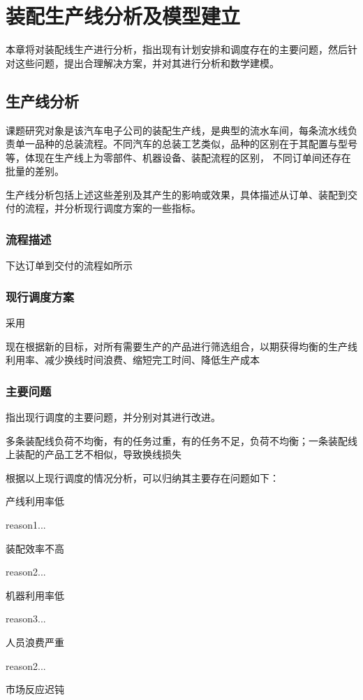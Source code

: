 \chapter{装配生产线分析及模型建立}
本章将对装配线生产进行分析，指出现有计划安排和调度存在的主要问题，然后针对这些问题，提出合理解决方案，并对其进行分析和数学建模。
\section{生产线分析}
课题研究对象是该汽车电子公司的装配生产线，是典型的流水车间，每条流水线负责单一品种的总装流程。不同汽车的总装工艺类似，品种的区别在于其配置与型号等，体现在生产线上为零部件、机器设备、装配流程的区别，
不同订单间还存在批量的差别。

生产线分析包括上述这些差别及其产生的影响或效果，具体描述从订单、装配到交付的流程，并分析现行调度方案的一些指标。

\subsection{流程描述}
下达订单到交付的流程如所示
\subsection{现行调度方案}
采用

现在根据新的目标，对所有需要生产的产品进行筛选组合，以期获得均衡的生产线利用率、减少换线时间浪费、缩短完工时间、降低生产成本

\subsection{主要问题}
指出现行调度的主要问题，并分别对其进行改进。

多条装配线负荷不均衡，有的任务过重，有的任务不足，负荷不均衡；一条装配线上装配的产品工艺不相似，导致换线损失

根据以上现行调度的情况分析，可以归纳其主要存在问题如下：
\renewcommand{\labelenumi}{(\theenumi)}
\begin{asparaenum}
\item 产线利用率低

reason1...
\item 装配效率不高

reason2...
\item 机器利用率低

reason3...
\item 人员浪费严重

reason2...
\item 市场反应迟钝
\end{asparaenum}

